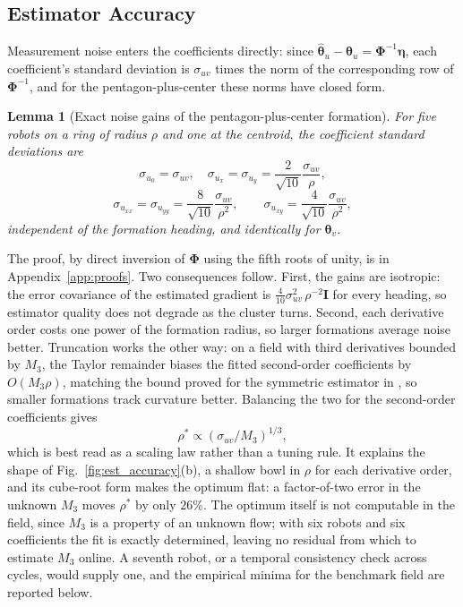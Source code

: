 \documentclass[lettersize,journal]{IEEEtran}
\newtheorem{lemma}{Lemma}
\begin{document}
\subsection{Estimator Accuracy}
\label{sec:sensitivity}

Measurement noise enters the coefficients directly: since
$\hat{\boldsymbol{\theta}}_u - \boldsymbol{\theta}_u =
\boldsymbol{\Phi}^{-1}\boldsymbol{\eta}$, each coefficient's standard
deviation is $\sigma_{uv}$ times the norm of the corresponding row of
$\boldsymbol{\Phi}^{-1}$, and for the pentagon-plus-center these norms
have closed form.

\begin{lemma}[Exact noise gains of the pentagon-plus-center formation]
\label{lem:gains}
For five robots on a ring of radius $\rho$ and one at the centroid, the
coefficient standard deviations are
\begin{equation}
    \sigma_{u_0} = \sigma_{uv}, \quad
    \sigma_{u_x} = \sigma_{u_y} = \frac{2}{\sqrt{10}}\frac{\sigma_{uv}}{\rho},
    \label{eq:gain_grad}
\end{equation}
\begin{equation}
    \sigma_{u_{xx}} = \sigma_{u_{yy}} = \frac{8}{\sqrt{10}}
    \frac{\sigma_{uv}}{\rho^2},
    \qquad
    \sigma_{u_{xy}} = \frac{4}{\sqrt{10}}\frac{\sigma_{uv}}{\rho^2},
    \label{eq:gain_hess}
\end{equation}
independent of the formation heading, and identically for
$\boldsymbol{\theta}_v$.
\end{lemma}

The proof, by direct inversion of $\boldsymbol{\Phi}$ using the fifth
roots of unity, is in Appendix~\ref{app:proofs}. Two consequences
follow. First, the gains are isotropic: the error covariance of the
estimated gradient is $\tfrac{4}{10}\sigma_{uv}^2\,\rho^{-2}\mathbf{I}$
for every heading, so estimator quality does not degrade as the cluster
turns. Second, each derivative order costs one power of the formation
radius, so larger formations average noise better. Truncation works the
other way: on a field with third derivatives bounded by $M_3$, the
Taylor remainder biases the fitted second-order coefficients by $O(M_3
\rho)$, matching the bound proved for the symmetric estimator in
\cite{15}, so smaller formations track curvature better. Balancing the
two for the second-order coefficients gives
\begin{equation}
    \rho^* \propto \left(\sigma_{uv}/M_3\right)^{1/3},
    \label{eq:rho_star}
\end{equation}
which is best read as a scaling law rather than a tuning rule. It
explains the shape of Fig.~\ref{fig:est_accuracy}(b), a shallow bowl in
$\rho$ for each derivative order, and its cube-root form makes the
optimum flat: a factor-of-two error in the unknown $M_3$ moves $\rho^*$
by only $26\%$. The optimum itself is not computable in the field, since
$M_3$ is a property of an unknown flow; with six robots and six
coefficients the fit is exactly determined, leaving no residual from
which to estimate $M_3$ online. A seventh robot, or a temporal
consistency check across cycles, would supply one, and the empirical
minima for the benchmark field are reported below.
\end{document}
